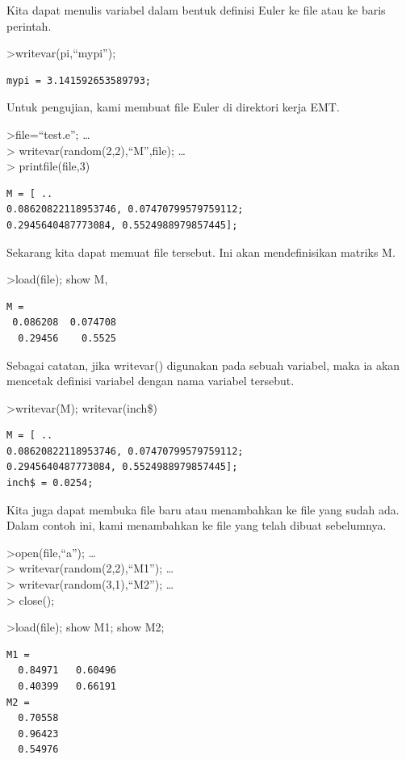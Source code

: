 \documentclass[
]{book}
\begin{document}
Kita dapat menulis variabel dalam bentuk definisi Euler ke file atau ke baris perintah.

\textgreater writevar(pi,``mypi'');

\begin{verbatim}
mypi = 3.141592653589793;
\end{verbatim}

Untuk pengujian, kami membuat file Euler di direktori kerja EMT.

\textgreater file=``test.e''; \ldots{}\\
\textgreater{} writevar(random(2,2),``M'',file); \ldots{}\\
\textgreater{} printfile(file,3)

\begin{verbatim}
M = [ ..
0.08620822118953746, 0.07470799579759112;
0.2945640487773084, 0.5524988979857445];
\end{verbatim}

Sekarang kita dapat memuat file tersebut. Ini akan mendefinisikan matriks M.

\textgreater load(file); show M,

\begin{verbatim}
M = 
 0.086208  0.074708 
  0.29456    0.5525 
\end{verbatim}

Sebagai catatan, jika writevar() digunakan pada sebuah variabel, maka ia akan mencetak definisi variabel dengan nama variabel tersebut.

\textgreater writevar(M); writevar(inch\$)

\begin{verbatim}
M = [ ..
0.08620822118953746, 0.07470799579759112;
0.2945640487773084, 0.5524988979857445];
inch$ = 0.0254;
\end{verbatim}

Kita juga dapat membuka file baru atau menambahkan ke file yang sudah ada. Dalam contoh ini, kami menambahkan ke file yang telah dibuat sebelumnya.

\textgreater open(file,``a''); \ldots{}\\
\textgreater{} writevar(random(2,2),``M1''); \ldots{}\\
\textgreater{} writevar(random(3,1),``M2''); \ldots{}\\
\textgreater{} close();

\textgreater load(file); show M1; show M2;

\begin{verbatim}
M1 = 
  0.84971   0.60496 
  0.40399   0.66191 
M2 = 
  0.70558 
  0.96423 
  0.54976 
\end{verbatim}
\end{document}
